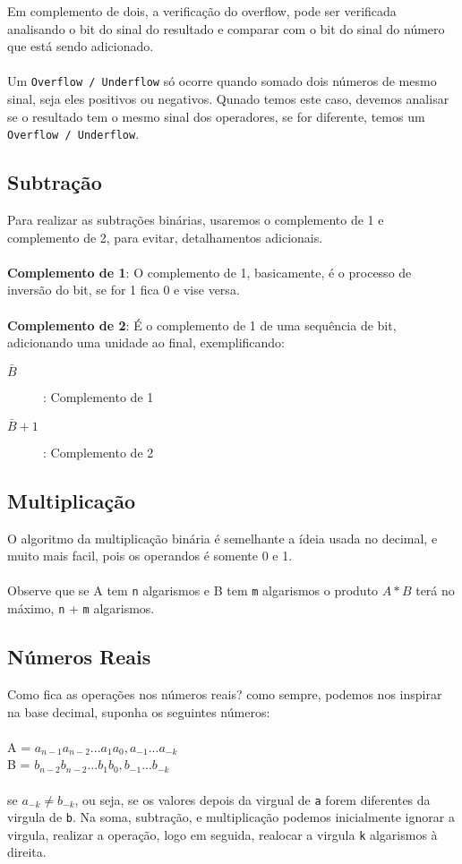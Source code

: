 \documentclass[12pt, onecolumn]{article}
\begin{document}
	Em complemento de dois, a verificação do overflow, pode ser verificada
	analisando o bit do sinal do resultado e comparar com o bit do sinal
	do número que está sendo adicionado.\\
	\\
	Um \texttt{Overflow / Underflow} só ocorre quando somado dois números de 
	mesmo sinal, seja eles positivos ou negativos. Qunado temos este caso, 
	devemos analisar se o resultado tem o mesmo sinal dos operadores, se for
	diferente, temos um \texttt{Overflow / Underflow}.

	\subsection{Subtração}
	Para realizar as subtrações binárias, usaremos o complemento de 1 e complemento
	de 2, para evitar, detalhamentos adicionais.\\
	\\
	\textbf{Complemento de 1}: O complemento de 1, basicamente, é o processo
	de inversão do bit, se for 1 fica 0 e vise versa.\\
	\\
	\textbf{Complemento de 2}: É o complemento de 1 de uma sequência de bit,
	adicionando uma unidade ao final, exemplificando:
	
	\begin{description}
		\item[$\bar{B}$]: Complemento de 1
		\item[$\bar{B} + 1$]: Complemento de 2
	\end{description}

	\subsection{Multiplicação}
	O algoritmo da multiplicação binária é semelhante a ídeia usada no decimal, 
	e muito mais facil, pois os operandos é somente 0 e 1.\\
	\\
	Observe que se A tem \texttt{n} algarismos e B tem \texttt{m} algarismos
	o produto $A * B$ terá no máximo, \texttt{n} + \texttt{m} algarismos.
	
	\subsection{Números Reais}
	Como fica as operações nos números reais? como sempre, podemos nos inspirar na
	base decimal, suponha os seguintes números: \\
	\\
	A = $a_{n-1} a_{n-2} ... a_1 a_0, a_{-1} ... a_{-k}$\\
	B = $b_{n-2} b_{n-2} ... b_1 b_0, b_{-1} ... b_{-k}$\\
	\\
	se $a_{-k} \ne b_{-k}$, ou seja, se os valores depois da virgual de \texttt{a} 
	forem diferentes da virgula de \texttt{b}. Na soma, subtração, e multiplicação
	podemos	inicialmente ignorar a virgula, realizar a operação, logo em seguida, 
	realocar a virgula \texttt{k} algarismos à direita.
\end{document}

